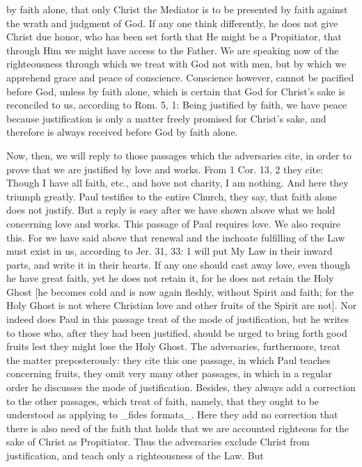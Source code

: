 by faith alone, that only Christ the Mediator is to be presented by
faith against the wrath and judgment of God.  If any one think
differently, he does not give Christ due honor, who has been set
forth that He might be a Propitiator, that through Him we might have
access to the Father.  We are speaking now of the righteousness
through which we treat with God not with men, but by which we
apprehend grace and peace of conscience.  Conscience however, cannot
be pacified before God, unless by faith alone, which is certain that
God for Christ's sake is reconciled to us, according to Rom. 5, 1:
Being justified by faith, we have peace because justification is only
a matter freely promised for Christ's sake, and therefore is always
received before God by faith alone.

Now, then, we will reply to those passages which the adversaries cite,
in order to prove that we are justified by love and works.  From 1
Cor. 13, 2 they cite: Though I have all faith, etc., and hove not
charity, I am nothing.  And here they triumph greatly.  Paul
testifies to the entire Church, they say, that faith alone does not
justify.  But a reply is easy after we have shown above what we hold
concerning love and works.  This passage of Paul requires love.  We
also require this.  For we have said above that renewal and the
inchoate fulfilling of the Law must exist in us, according to Jer. 31,
33: 1 will put My Law in their inward parts, and write it in their
hearts.  If any one should cast away love, even though he have great
faith, yet he does not retain it, for he does not retain the Holy
Ghost [he becomes cold and is now again fleshly, without Spirit and
faith; for the Holy Ghost is not where Christian love and other
fruits of the Spirit are not].  Nor indeed does Paul in this passage
treat of the mode of justification, but he writes to those who, after
they had been justified, should be urged to bring forth good fruits
lest they might lose the Holy Ghost.  The adversaries, furthermore,
treat the matter preposterously: they cite this one passage, in which
Paul teaches concerning fruits, they omit very many other passages,
in which in a regular order he discusses the mode of justification.
Besides, they always add a correction to the other passages, which
treat of faith, namely, that they ought to be understood as applying
to _fides formata_.  Here they add no correction that there is also
need of the faith that holds that we are accounted righteous for the
sake of Christ as Propitiator.  Thus the adversaries exclude Christ
from justification, and teach only a righteousness of the Law.  But
